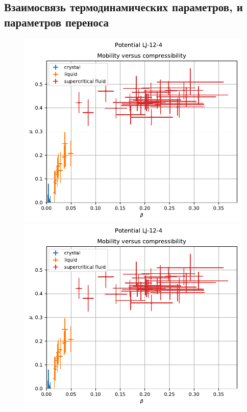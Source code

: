 \documentclass[pdf,hyperref={unicode}]{beamer}
\begin{document}
\subsection{Взаимосвязь термодинамических параметров, и параметров переноса}



\begin{frame}
\transdissolve[duration=0.2]

\begin{figure}[h]
\begin{center}
\begin{minipage}[h]{0.35\linewidth}
\includegraphics[width=\textwidth, keepaspectratio]{plot_compress_mobility_Potential LJ-12-4_1}
\end{minipage}
\begin{minipage}[h]{0.35\linewidth}
\includegraphics[width=\textwidth, keepaspectratio]{plot_compress_mobility_Potential LJ-12-4_1}
\end{minipage}


\end{center}
\end{figure}
\end{frame}
\end{document}
